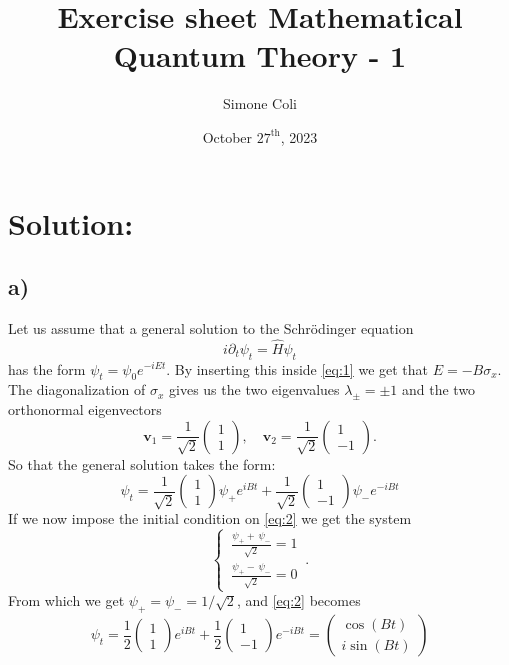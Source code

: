 \documentclass{article}
\title{Exercise sheet Mathematical Quantum Theory - 1}
\author{Simone Coli}
\date{October $27^{\mbox{th}}$, 2023}
\begin{document}
\maketitle
\section{Solution:}
\subsection*{a)}
Let us assume that a general solution to the Schrödinger equation
\begin{equation}\label{eq:1}
    i \partial_t \psi_t = \hat H \psi_t
\end{equation}
has the form $\psi_t = \psi_0 e^{-iEt}$. By inserting this inside \eqref{eq:1} we get that $E = -B\sigma_x$. The diagonalization of $\sigma_x$ gives us the two eigenvalues $\lambda_{\pm} = \pm 1$ and the two orthonormal eigenvectors
\[
    \mathbf v_1 = \frac{1}{\sqrt{2}}
    \begin{pmatrix}
        1\\
        1
    \end{pmatrix}
    ,\quad
    \mathbf v_2 = \frac{1}{\sqrt{2}}
    \begin{pmatrix}
        1\\
        -1
    \end{pmatrix}.
\]
So that the general solution takes the form:
\begin{equation}\label{eq:2}
    \psi_t = \frac{1}{\sqrt{2}} 
    \begin{pmatrix}
        1\\
        1
    \end{pmatrix}
    \psi_+ e^{iBt} + \frac{1}{\sqrt{2}} 
    \begin{pmatrix}
        1\\
        -1
    \end{pmatrix}
    \psi_- e^{-iBt}
\end{equation}
If we now impose the initial condition on \eqref{eq:2} we get the system
\[
    \begin{cases}
      \,\frac{\psi_+ +\, \psi_-}{\sqrt{2}} = 1\\
      \,\frac{\psi_+ -\, \psi_-}{\sqrt{2}} = 0
    \end{cases}\,.
\]
From which we get $\psi_+ = \psi_- = 1/\sqrt{2}$, and \eqref{eq:2} becomes
\begin{equation}\label{eq:3}
    \psi_t = \frac{1}{2} 
    \begin{pmatrix}
        1\\
        1
    \end{pmatrix}
    e^{iBt} + \frac{1}{2} 
    \begin{pmatrix}
        1\\
        -1
    \end{pmatrix}
    e^{-iBt} = 
    \begin{pmatrix}
        \cos{(Bt)}\\
        i \sin{(Bt)}
    \end{pmatrix}
\end{equation}
\end{document}
